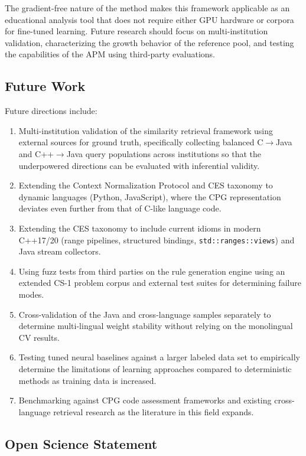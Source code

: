The gradient-free nature of the method makes this framework applicable as an educational analysis tool that does not require either GPU hardware or corpora for fine-tuned learning. Future research should focus on multi-institution validation, characterizing the growth behavior of the reference pool, and testing the capabilities of the APM using third-party evaluations.

\subsection{Future Work}
\label{subsec:future_work}

Future directions include:
\begin{enumerate}
    \item  Multi-institution validation of the similarity retrieval framework using external sources for ground truth, specifically collecting balanced C$\rightarrow$Java and C++$\rightarrow$Java query populations across institutions so that the underpowered directions can be evaluated with inferential validity.
    \item Extending the Context Normalization Protocol and CES taxonomy to dynamic languages (Python, JavaScript), where the CPG representation deviates even further from that of C-like language code.
    \item Extending the CES taxonomy to include current idioms in modern C++17/20 (range pipelines, structured bindings, \texttt{std::ranges::views}) and Java stream collectors.
    \item Using fuzz tests from third parties on the rule generation engine using an extended CS-1 problem corpus and external test suites for determining failure modes.
    \item Cross-validation of the Java and cross-language samples separately to determine multi-lingual weight stability without relying on the monolingual CV results.
    \item Testing tuned neural baselines against a larger labeled data set to empirically determine the limitations of learning approaches compared to deterministic methods as training data is increased.
    \item Benchmarking against CPG code assessment frameworks and existing cross-language retrieval research as the literature in this field expands.
\end{enumerate}

\subsection{Open Science Statement}

